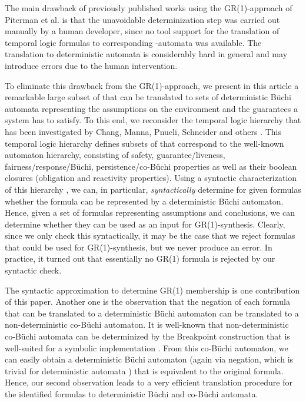 \documentclass[submission,copyright,creativecommons]{eptcs}
\begin{document}
The main drawback of previously published works using the GR(1)-approach of Piterman et al. is that the unavoidable determinization step was carried out manually by a human developer, since no tool support for the translation of temporal logic formulas to corresponding -automata was available. The translation to deterministic automata is considerably hard in general \cite{KuVa98c} and may introduce errors due to the human intervention.

To eliminate this drawback from the GR(1)-approach, we present in this article a remarkable large subset of \LTL{} that can be translated to sets of deterministic Büchi automata representing the assumptions on the environment and the guarantees a system has to satisfy. To this end, we reconsider the temporal logic hierarchy that has been investigated by Chang, Manna, Pnueli, Schneider and others \cite{MaPn87c,ChMP92,MaPn90,MaPn91,Schn01b,Schn03}. This temporal logic hierarchy defines subsets of \LTL{} that correspond to the well-known automaton hierarchy, consisting of safety, guarantee/liveness, fairness/response/Büchi, persistence/co-Büchi properties as well as their boolean closures (obligation and reactivity properties). Using a syntactic characterization of this hierarchy \cite{Schn01b,Schn03}, we can, in particular, \emph{syntactically} determine for given \LTL{} formulas whether the formula can be represented by a deterministic Büchi automaton. Hence, given a set of formulas representing assumptions and conclusions, we can determine whether they can be used as an input for GR(1)-synthesis. Clearly, since we only check this syntactically, it may be the case that we reject formulas that could be used for GR(1)-synthesis, but we never produce an error. In practice, it turned out that essentially no GR(1) formula is rejected by our syntactic check.

The syntactic approximation to determine GR(1) membership is one contribution of this paper. Another one is the observation that the negation of each formula that can be translated to a deterministic Büchi automaton can be translated to a non-deterministic co-Büchi automaton. It is well-known that non-deterministic co-Büchi automata can be determinized by the Breakpoint construction \cite{MiHa84} that is well-suited for a symbolic implementation \cite{MoSL08,BoKu09a}. From this co-Büchi automaton, we can easily obtain a deterministic Büchi automaton (again via negation, which is trivial for deterministic automata \cite{Schn03}) that is equivalent to the original formula. Hence, our second observation leads to a very efficient translation procedure for the identified \LTL{} formulas to deterministic Büchi and co-Büchi automata.
\end{document}
